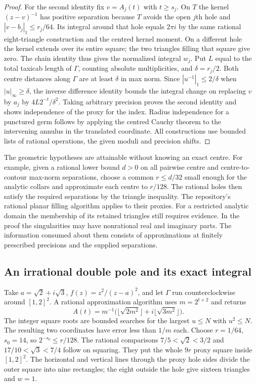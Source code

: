\begin{proof}
For the second identity fix $v=A_j(t)$ with $t\ge s_j$. On $T$ the
kernel $(z-v)^{-1}$ has positive separation because $T$ avoids the open
$j$th hole and $|v-b_j|_1\le r_j/64$. Its integral around that hole
equals $2\pi i$ by the same rational eight-triangle construction and
the centred kernel moment. On a different hole the kernel extends over
its entire square; the two triangles filling that square give zero.
The chain identity thus gives the normalized integral $w_j$.
Put $L$ equal to the total taxicab length of $\Gamma$, counting
absolute multiplicities, and $\delta=r_j/2$. Both centre distances
along $\Gamma$ are at least $\delta$ in max norm. Since
$|u^{-1}|_1\le2/\delta$ when $|u|_\infty\ge\delta$, the inverse
difference identity bounds the integral change on replacing $v$ by
$a_j$ by $4L2^{-t}/\delta^2$. Taking arbitrary precision proves the
second identity and shows independence of the proxy for the index.
Radius independence for a punctured germ follows by applying the
centred Cauchy theorem to the intervening annulus in the translated
coordinate. All constructions use bounded lists of rational
operations, the given moduli and precision shifts.
\end{proof}

The geometric hypotheses are attainable without knowing an exact
centre. For example, given a rational lower bound $d>0$ on all
pairwise centre and centre-to-contour max-norm separations, choose a
common $r\le d/32$ small enough for the analytic collars and approximate
each centre to $r/128$. The rational holes then satisfy the required
separations by the triangle inequality. The repository's rational
planar filling algorithm applies to their proxies. For a restricted
analytic domain the membership of its retained triangles still requires
evidence. In the proof the singularities may have nonrational real and
imaginary parts. The information consumed about them consists of
approximations at finitely prescribed precisions and the supplied
separations.

\subsection{An irrational double pole and its exact integral}

Take $a=\sqrt2+i\sqrt3$, $f(z)=z^2/(z-a)^2$, and let $\Gamma$ run
counterclockwise around $[1,2]^2$. A rational approximation algorithm
uses $m=2^{t+2}$ and returns
\[
 A(t)=m^{-1}\bigl(\lfloor\sqrt{2m^2}\rfloor
                 +i\lfloor\sqrt{3m^2}\rfloor\bigr).
\]
The integer square roots are bounded searches for the largest $u\le N$
with $u^2\le N$. The resulting two coordinates have error less than
$1/m$ each. Choose $r=1/64$, $s_0=14$, so $2^{-s_0}\le r/128$.
The rational comparisons $7/5<\sqrt2<3/2$ and
$17/10<\sqrt3<7/4$ follow on squaring. They put the whole $9r$
proxy square inside $[1,2]^2$. The horizontal and vertical lines
through the proxy hole sides divide the outer square into nine
rectangles; the eight outside the hole give sixteen triangles and
$w=1$.

